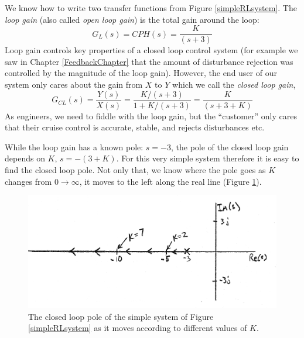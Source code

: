 We know how to write two transfer functions from Figure \ref{simpleRLsystem}.   The {\it loop gain} (also called {\it open loop gain}) is the total gain around the loop:
\[
G_L(s) = CPH(s) = \frac{K}{(s+3)}
\]
Loop gain controls key properties of a closed loop control system (for example we saw in Chapter \ref{FeedbackChapter}
that the amount of disturbance rejection was controlled by the magnitude of the loop gain).
However, the end user of our system only cares about the gain from $X$ to $Y$ which we  call
the {\it closed loop gain},
\[
G_{CL}(s) = \frac{Y(s)}{X(s)} = \frac {K/(s+3)} {1+K/(s+3)} = \frac {K} {(s+3+K)}
\]
As engineers, we need to fiddle with the loop gain, but the ``customer'' only cares that their cruise control is accurate, stable, and rejects disturbances etc.

While the loop gain has a known pole: $s=-3$, the pole of the closed loop gain depends on $K$, $s=-(3+K)$.   For this very simple system therefore it is easy to find the closed loop pole.   Not only that, we know where the pole goes as $K$ changes from $0\to\infty$, it moves to the left along the real line (Figure \ref{movingsimplepole}).

\begin{figure}\centering
\includegraphics[width=120mm]{figs07/00971.png}
\caption{The closed loop pole of the simple system of Figure \ref{simpleRLsystem} as it moves according to different values of $K$.}\label{movingsimplepole}
\end{figure}




